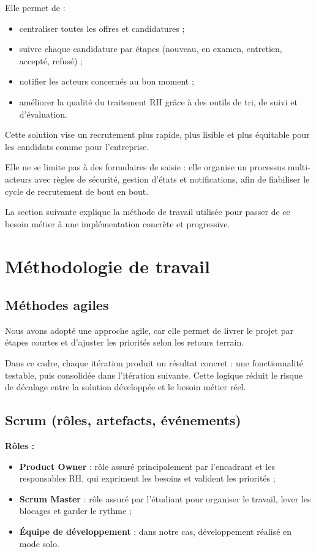 Elle permet de :
\begin{itemize}
    \item centraliser toutes les offres et candidatures ;
    \item suivre chaque candidature par étapes (nouveau, en examen,
    entretien, accepté, refusé) ;
    \item notifier les acteurs concernés au bon moment ;
    \item améliorer la qualité du traitement RH grâce à des outils de
    tri, de suivi et d'évaluation.
\end{itemize}

Cette solution vise un recrutement plus rapide, plus lisible et plus
équitable pour les candidats comme pour l'entreprise.

Elle ne se limite pas à des formulaires de saisie : elle organise un
processus multi-acteurs avec règles de sécurité, gestion d'états et
notifications, afin de fiabiliser le cycle de recrutement de bout en bout.

La section suivante explique la méthode de travail utilisée pour passer
de ce besoin métier à une implémentation concrète et progressive.

\section{Méthodologie de travail}

\subsection{Méthodes agiles}

Nous avons adopté une approche agile, car elle permet de livrer le projet
par étapes courtes et d'ajuster les priorités selon les retours terrain.

Dans ce cadre, chaque itération produit un résultat concret : une
fonctionnalité testable, puis consolidée dans l'itération suivante.
Cette logique réduit le risque de décalage entre la solution développée
et le besoin métier réel.

\subsection{Scrum (rôles, artefacts, événements)}

\textbf{Rôles :}
\begin{itemize}
    \item \textbf{Product Owner} : rôle assuré principalement par
    l'encadrant et les responsables RH, qui expriment les besoins et
    valident les priorités ;
    \item \textbf{Scrum Master} : rôle assuré par l'étudiant pour
    organiser le travail, lever les blocages et garder le rythme ;
    \item \textbf{Équipe de développement} : dans notre cas,
    développement réalisé en mode solo.
\end{itemize}


